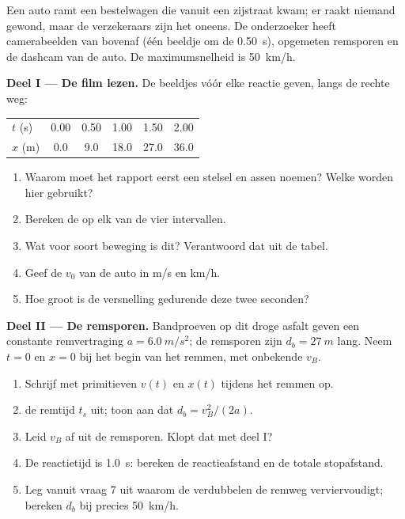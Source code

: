 \begin{problem}
\label{pb:g12:kinematics-2d:1}
Een auto ramt een bestelwagen die vanuit een zijstraat kwam; er raakt
niemand gewond, maar de verzekeraars zijn het oneens. De onderzoeker heeft
camerabeelden van bovenaf (één beeldje om de \qty{0.50}{s}), opgemeten
remsporen en de dashcam van de auto. De maximumsnelheid is
\qty{50}{km/h}.

\medskip
\noindent\textbf{Deel I --- De film lezen.}
De beeldjes vóór elke reactie geven, langs de rechte weg:
\begin{center}\small
\begin{tabular}{lccccc}
$t$ (\unit{s}) & 0.00 & 0.50 & 1.00 & 1.50 & 2.00\\
$x$ (\unit{m}) & 0.0 & 9.0 & 18.0 & 27.0 & 36.0
\end{tabular}
\end{center}
\begin{enumerate}
  \item Waarom moet het rapport eerst een stelsel en assen noemen? Welke
        worden hier gebruikt?
  \item Bereken de  op elk van de vier intervallen.
  \item Wat voor soort beweging is dit? Verantwoord dat uit de tabel.
  \item Geef de  $v_0$ van de auto in \unit{m/s} en \unit{km/h}.
  \item Hoe groot is de versnelling gedurende deze twee seconden?
\end{enumerate}

\medskip
\noindent\textbf{Deel II --- De remsporen.}
Bandproeven op dit droge asfalt geven een constante remvertraging
$a = \qty{6.0}{m/s^2}$; de remsporen zijn $d_b = \qty{27}{m}$ lang. Neem
$t = 0$ en $x = 0$ bij het begin van het remmen, met onbekende 
$v_B$.
\begin{enumerate}[resume]
  \item Schrijf met primitieven $v(t)$ en $x(t)$ tijdens het remmen op.
  \item {} de remtijd $t_s$ uit; toon aan dat $d_b = v_B^2/(2a)$.
  \item Leid $v_B$ af uit de remsporen. Klopt dat met deel I?
  \item De reactietijd is \qty{1.0}{s}: bereken de reactieafstand en de
        totale stopafstand.
  \item Leg vanuit vraag 7 uit waarom de  verdubbelen de remweg
        verviervoudigt; bereken $d_b$ bij precies \qty{50}{km/h}.
\end{enumerate}


\end{problem}
